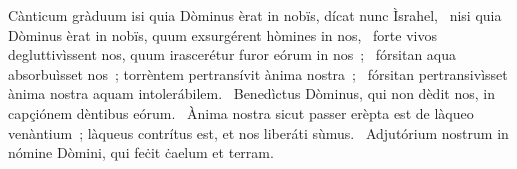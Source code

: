{ Cànticum gràduum}
{%
isi quia Dòminus èrat in nobïs, dícat nunc Ìsrahel, 
~nisi quia Dòminus èrat in nobïs, quum exsurgérent hòmines in nos, 
~forte vivos degluttivìssent nos, quum irascerétur furor eórum in nos~; 
~fórsitan aqua absorbuìsset nos~; torrèntem pertransívit ànima nostra~; 
~fórsitan pertransivìsset ànima nostra aquam intolerábilem. 
~Benedìctus Dòminus, qui non dèdit nos, in capçiónem dèntibus eórum. 
~Ànima nostra sicut passer erèpta est de làqueo venàntium~; làqueus contrítus est, et nos liberáti sùmus. 
~Adjutórium nostrum in nómine Dòmini, qui feċit ċaelum et terram. 
}
